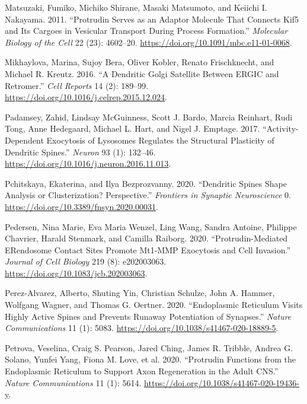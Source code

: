 \documentclass[
]{article}
\newlength{\cslhangindent}
\newlength{\cslentryspacingunit} %
\newenvironment{CSLReferences}[2] %
 {%
  \setlength{\parindent}{0pt}
  \ifodd #1
  \let\oldpar\par
  \def\par{\hangindent=\cslhangindent\oldpar}
  \fi
  \setlength{\parskip}{#2\cslentryspacingunit}
 }%
 {}
\begin{document}
\begin{CSLReferences}{1}{0}
\leavevmode{}%
Matsuzaki, Fumiko, Michiko Shirane, Masaki Matsumoto, and Keiichi I.
Nakayama. 2011. {``Protrudin Serves as an Adaptor Molecule That Connects
{Kif5} and Its Cargoes in Vesicular Transport During Process
Formation.''} \emph{Molecular Biology of the Cell} 22 (23): 4602--20.
\url{https://doi.org/10.1091/mbc.e11-01-0068}.

\leavevmode{}%
Mikhaylova, Marina, Sujoy Bera, Oliver Kobler, Renato Frischknecht, and
Michael R. Kreutz. 2016. {``A {Dendritic Golgi Satellite} Between
{ERGIC} and {Retromer}.''} \emph{Cell Reports} 14 (2): 189--99.
\url{https://doi.org/10.1016/j.celrep.2015.12.024}.

\leavevmode{}%
Padamsey, Zahid, Lindsay McGuinness, Scott J. Bardo, Marcia Reinhart,
Rudi Tong, Anne Hedegaard, Michael L. Hart, and Nigel J. Emptage. 2017.
{``Activity-{Dependent Exocytosis} of {Lysosomes Regulates} the
{Structural Plasticity} of {Dendritic Spines}.''} \emph{Neuron} 93 (1):
132--46. \url{https://doi.org/10.1016/j.neuron.2016.11.013}.

\leavevmode{}%
Pchitskaya, Ekaterina, and Ilya Bezprozvanny. 2020. {``Dendritic {Spines
Shape Analysis} or {Clusterization}?
{Perspective}.''} \emph{Frontiers in Synaptic Neuroscience} 0.
\url{https://doi.org/10.3389/fnsyn.2020.00031}.

\leavevmode{}%
Pedersen, Nina Marie, Eva Maria Wenzel, Ling Wang, Sandra Antoine,
Philippe Chavrier, Harald Stenmark, and Camilla Raiborg. 2020.
{``Protrudin-Mediated {ER}\textendash endosome Contact Sites Promote
{Mt1-MMP} Exocytosis and Cell Invasion.''} \emph{Journal of Cell
Biology} 219 (8): e202003063.
\url{https://doi.org/10.1083/jcb.202003063}.

\leavevmode{}%
Perez-Alvarez, Alberto, Shuting Yin, Christian Schulze, John A. Hammer,
Wolfgang Wagner, and Thomas G. Oertner. 2020. {``Endoplasmic Reticulum
Visits Highly Active Spines and Prevents Runaway Potentiation of
Synapses.''} \emph{Nature Communications} 11 (1): 5083.
\url{https://doi.org/10.1038/s41467-020-18889-5}.

\leavevmode{}%
Petrova, Veselina, Craig S. Pearson, Jared Ching, James R. Tribble,
Andrea G. Solano, Yunfei Yang, Fiona M. Love, et al. 2020. {``Protrudin
Functions from the Endoplasmic Reticulum to Support Axon Regeneration in
the Adult {CNS}.''} \emph{Nature Communications} 11 (1): 5614.
\url{https://doi.org/10.1038/s41467-020-19436-y}.


\end{CSLReferences}
\end{document}
